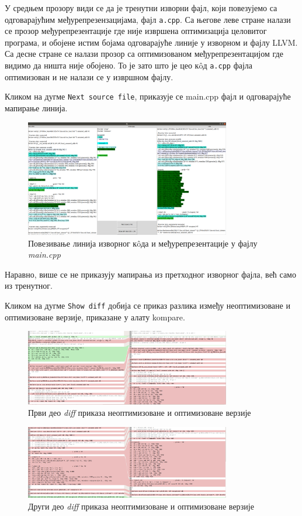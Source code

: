 \documentclass[12pt,oneside]{memoir}
\begin{document}
У средњем прозору види се да је тренутни изворни фајл, који повезујемо са одговарајућим
међурепрезензацијама, фајл \texttt{a.cpp}.
Са његове леве стране налази се прозор међурепрезентације где није извршена оптимизација
целовитог програма, и обојене истим бојама одговарајуће линије у изворном и
фајлу LLVM.
Са десне стране се налази прозор са оптимизованом међурепрезентацијом где видимо
да ништа није обојено.
То је зато што је цео к\^{o}д  \texttt{a.cpp} фајла оптимизован
и не налази се у извршном фајлу.

Кликом на дугме \texttt{Next source file}, приказује се main.cpp фајл и одговарајуће 
мапирање линија.
\begin{figure}[!ht]
  \centering
  \includegraphics[width=0.8\textwidth]{main_cpp.png}
  \caption{Повезивање линија изворног к\^{o}да и међурепрезентације у фајлу \textit{main.cpp } }
  \label{fig:grafikon}
\end{figure}
Наравно, више се не приказују мапирања из претходног изворног фајла, већ само из
тренутног.

Кликом на дугме \texttt{Show diff} добија се приказ разлика између неоптимизоване и оптимизоване
верзије, приказане у алату kompare.
\begin{figure}[!ht]
  \centering
  \includegraphics[width=0.8\textwidth]{diff_1.png}
  \caption{Први део \textit{diff} приказа неоптимизоване и оптимизоване верзије }
  \label{fig:grafikon}
\end{figure}
\begin{figure}[!ht]
  \centering
  \includegraphics[width=0.8\textwidth]{diff_2.png}
  \caption{Други део \textit{diff} приказа неоптимизоване и оптимизоване верзије}
  \label{fig:grafikon}
\end{figure}
\end{document}
